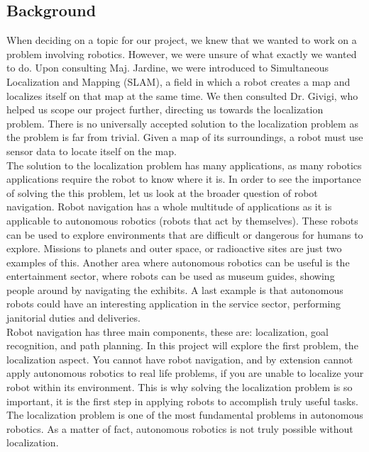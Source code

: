 \documentclass{article}
\newcommand\tab[1][0.5cm]{\hspace*{#1}}
\begin{document}
\subsection{Background}
\tab When deciding on a topic for our project, we knew that we wanted to work on a problem involving robotics. However, we were unsure of what exactly we wanted to do. Upon consulting Maj. Jardine, we were introduced to Simultaneous Localization and Mapping (SLAM), a field in which a robot creates a map and localizes itself on that map at the same time. We then consulted Dr. Givigi, who helped us scope our project further, directing us towards the localization problem. There is no universally accepted solution to the localization problem as the problem is far from trivial. Given a map of its surroundings, a robot must use sensor data to locate itself on the map\citep{ProbRob}.\\

The solution to the localization problem has many applications, as many robotics applications require the robot to know where it is. In order to see the importance of solving the this problem, let us look at the broader question of robot navigation. Robot navigation has a whole multitude of applications as it is applicable to autonomous robotics (robots that act by themselves). These robots can be used to explore environments that are difficult or dangerous for humans to explore. Missions to planets and outer space, or radioactive sites are just two examples of this. Another area where autonomous robotics can be useful is the entertainment sector, where robots can be used as museum guides, showing people around by navigating the exhibits. A last example is that autonomous robots could have an interesting application in the service sector, performing janitorial duties and deliveries. \\

Robot navigation has three main components, these are: localization, goal recognition, and path planning. In this project will explore the first problem, the localization aspect. You cannot have robot navigation, and by extension cannot apply autonomous robotics to real life problems, if you are unable to localize your robot within its environment. This is why solving the localization problem is so important, it is the first step in applying robots to accomplish truly useful tasks. The localization problem is one of the most fundamental problems in autonomous robotics. As a matter of fact, autonomous robotics is not truly possible without localization\citep{KalmanFilter}.
\end{document}
